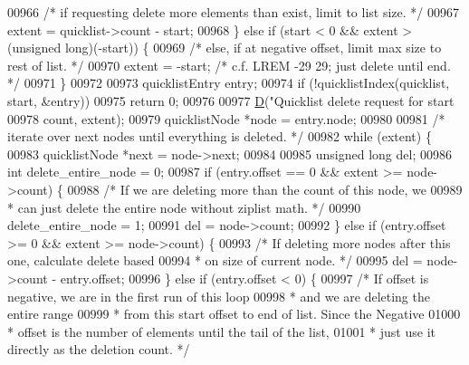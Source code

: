 \begin{DoxyCode}
{{{{{00966         \textcolor{comment}{/* if requesting delete more elements than exist, limit to list size. */}
00967         extent = quicklist->count - start;
00968     \} \textcolor{keywordflow}{else} \textcolor{keywordflow}{if} (start < 0 && extent > (\textcolor{keywordtype}{unsigned} \textcolor{keywordtype}{long})(-start)) \{
00969         \textcolor{comment}{/* else, if at negative offset, limit max size to rest of list. */}
00970         extent = -start; \textcolor{comment}{/* c.f. LREM -29 29; just delete until end. */}
00971     \}
00972 
00973     quicklistEntry entry;
00974     \textcolor{keywordflow}{if} (!quicklistIndex(quicklist, start, &entry))
00975         \textcolor{keywordflow}{return} 0;
00976 
00977     \hyperlink{debugmacro_8h_a74021f021dcdfbb22891787b79c5529d}{D}(\textcolor{stringliteral}{"Quicklist delete request for start %
00978       count, extent);
00979     quicklistNode *node = entry.node;
00980 
00981     \textcolor{comment}{/* iterate over next nodes until everything is deleted. */}
00982     \textcolor{keywordflow}{while} (extent) \{
00983         quicklistNode *next = node->next;
00984 
00985         \textcolor{keywordtype}{unsigned} \textcolor{keywordtype}{long} del;
00986         \textcolor{keywordtype}{int} delete\_entire\_node = 0;
00987         \textcolor{keywordflow}{if} (entry.offset == 0 && extent >= node->count) \{
00988             \textcolor{comment}{/* If we are deleting more than the count of this node, we}
00989 \textcolor{comment}{             * can just delete the entire node without ziplist math. */}
00990             delete\_entire\_node = 1;
00991             del = node->count;
00992         \} \textcolor{keywordflow}{else} \textcolor{keywordflow}{if} (entry.offset >= 0 && extent >= node->count) \{
00993             \textcolor{comment}{/* If deleting more nodes after this one, calculate delete based}
00994 \textcolor{comment}{             * on size of current node. */}
00995             del = node->count - entry.offset;
00996         \} \textcolor{keywordflow}{else} \textcolor{keywordflow}{if} (entry.offset < 0) \{
00997             \textcolor{comment}{/* If offset is negative, we are in the first run of this loop}
00998 \textcolor{comment}{             * and we are deleting the entire range}
00999 \textcolor{comment}{             * from this start offset to end of list.  Since the Negative}
01000 \textcolor{comment}{             * offset is the number of elements until the tail of the list,}
01001 \textcolor{comment}{             * just use it directly as the deletion count. */}
}}}}}}
\end{DoxyCode}
